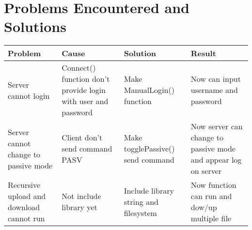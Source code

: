 \section{Problems Encountered and Solutions}
\begin{table}[h!]
\centering
 \begin{tabular}{|p{3cm}|p{4cm}|p{4cm}|p{4cm}|}
\hline
Problem & Cause & Solution & Result \\
\hline
Server cannot login & Connect() function don’t provide login with user and password & Make ManualLogin() function & Now can input username and password \\
\hline
Server cannot change to passive mode & Client don’t send command PASV & Make togglePassive() send command & Now server can change to passive mode and appear log on server \\
\hline
Recursive upload and download cannot run & Not include library yet & Include library string and filesystem & Now function can run and dow/up multiple file \\
\hline
\end{tabular}
\end{table}